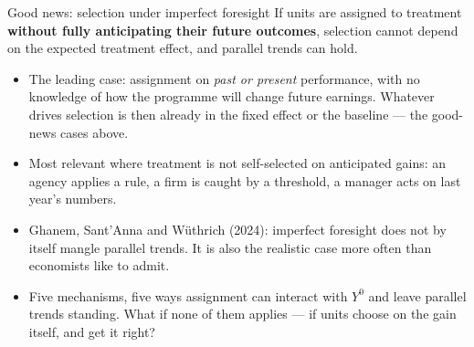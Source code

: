 \documentclass[
  11pt,
  ignorenonframetext,
  aspectratio=169,
]{beamer}
\newcounter{none} %
\providecommand{\tightlist}{%
  \setlength{\itemsep}{0pt}\setlength{\parskip}{0pt}}
\begin{document}
\begin{frame}{Good news: selection under imperfect foresight}
\protect{}\label{good-news-selection-under-imperfect-foresight}
If units are assigned to treatment \textbf{without fully anticipating
their future outcomes}, selection cannot depend on the expected
treatment effect, and parallel trends can hold.

\begin{itemize}
\tightlist
\item
  The leading case: assignment on \emph{past or present} performance,
  with no knowledge of how the programme will change future earnings.
  Whatever drives selection is then already in the fixed effect or the
  baseline --- the good-news cases above.
\item
  Most relevant where treatment is not self-selected on anticipated
  gains: an agency applies a rule, a firm is caught by a threshold, a
  manager acts on last year's numbers.
\item
  Ghanem, Sant'Anna and Wüthrich (2024): imperfect foresight does not by
  itself mangle parallel trends. It is also the realistic case more
  often than economists like to admit.
\end{itemize}

\vspace{0.3em}

\begin{itemize}
\tightlist
\item
  Five mechanisms, five ways assignment can interact with \(Y^0\) and
  leave parallel trends standing. What if none of them applies --- if
  units choose on the gain itself, and get it right?
\end{itemize}
\end{frame}
\end{document}
